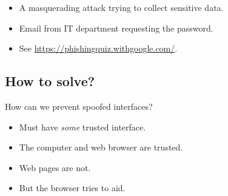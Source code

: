 \begin{frame}
  \begin{definition}[Phishing]
    \begin{itemize}
      \item A masquerading attack trying to collect sensitive data.
    \end{itemize}
  \end{definition}

  \begin{example}
    \begin{itemize}
      \item Email from IT department requesting the password.
      \item See \url{https://phishingquiz.withgoogle.com/}.
    \end{itemize}
  \end{example}
\end{frame}

\subsection{How to solve?}

\begin{frame}
  \begin{exercise}
    How can we prevent spoofed interfaces?
  \end{exercise}
\end{frame}

\begin{frame}
  \begin{solution}[In general]
    \begin{itemize}
      \item Must have \emph{some} trusted interface.
    \end{itemize}
  \end{solution}

  \begin{example}
    \begin{itemize}
      \item The computer and web browser are trusted.
      \item Web pages are not.
      \item But the browser tries to aid.
    \end{itemize}
  \end{example}
\end{frame}

